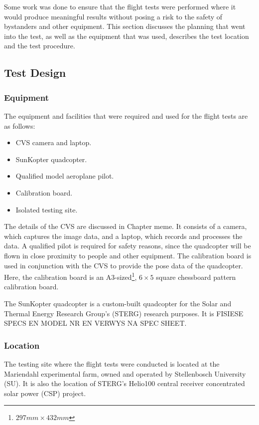Some work was done to ensure that the flight tests were performed where it would produce meaningful results without posing a risk to the safety of bystanders and other equipment. This section discusses the planning that went into the test, as well as the equipment that was used, describes the test location and the test procedure. 

\subsection{Test Design}

\subsubsection{Equipment}

The equipment and facilities that were required and used for the flight tests are as follows:

\begin{itemize}
    \item CVS camera and laptop.
    \item SunKopter quadcopter.
    \item Qualified model aeroplane pilot.
    \item Calibration board.
    \item Isolated testing site. 
\end{itemize}

The details of the CVS are discussed in Chapter meme. It consists of a camera, which captures the image data, and a laptop, which records and processes the data. A qualified pilot is required for safety reasons, since the quadcopter will be flown in close proximity to people and other equipment. The calibration board is used in conjunction with the CVS to provide the pose data of the quadcopter. Here, the calibration board is an A3-sized\footnote{$297mm\times432mm$}, $6\times5$ square chessboard pattern calibration board. 

The SunKopter quadcopter is a custom-built quadcopter for the Solar and Thermal Energy Research Group's (STERG) research purposes. It is FISIESE SPECS EN MODEL NR EN VERWYS NA SPEC SHEET\@.

\subsubsection{Location}

The testing site where the flight tests were conducted is located at the Mariendahl experimental farm, owned and operated by Stellenbosch University (SU). It is also the location of STERG's Helio100 central receiver concentrated solar power (CSP) project. 


